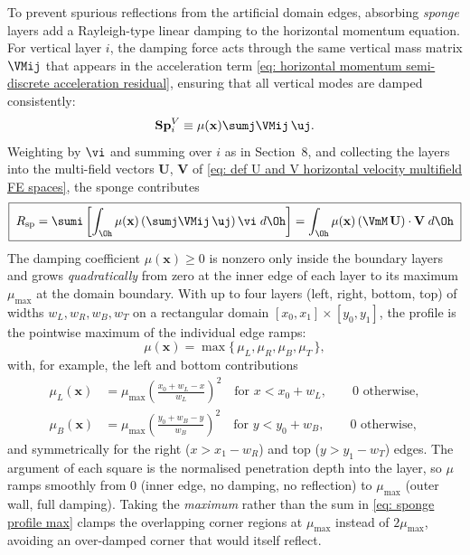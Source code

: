 To prevent spurious reflections from the artificial domain edges, absorbing \emph{sponge} layers add a
Rayleigh-type linear damping to the horizontal momentum equation. For vertical layer $i$, the damping
force acts through the same vertical mass matrix $\VMij$ that appears in the acceleration term
\eqref{eq: horizontal momentum semi-discrete acceleration residual}, ensuring that all vertical modes
are damped consistently:
\begin{equation}
    \mathbf{Sp}_i^V \equiv \mu(\mathbf{x})\sumj \VMij\,\uj .
    \label{eq: sponge semi-discrete term}
\end{equation}
Weighting by $\vi$ and summing over $i$ as in Section~8, and collecting the layers into the
multi-field vectors $\mathbf{U}$, $\mathbf{V}$ of
\eqref{eq: def U and V horizontal velocity multifield FE spaces}, the sponge contributes
\begin{equation}
    \boxed{\; R_{\text{sp}} = \sumi\left[\int_{\Oh}\mu(\mathbf{x})\left(\sumj\VMij\,\uj\right)\vi\;d\Oh\right] = \int_{\Oh}\mu(\mathbf{x})\left(\VmM\,\mathbf{U}\right)\cdot\mathbf{V}\;d\Oh \;}
    \label{eq: sponge residual contribution}
\end{equation}
The damping coefficient $\mu(\mathbf{x})\ge0$ is nonzero only inside the boundary layers and grows
\emph{quadratically} from zero at the inner edge of each layer to its maximum $\mu_{\max}$ at the
domain boundary. With up to four layers (left, right, bottom, top) of widths $w_L, w_R, w_B, w_T$ on a
rectangular domain $[x_0,x_1]\times[y_0,y_1]$, the profile is the pointwise maximum of the individual
edge ramps:
\begin{equation}
    \mu(\mathbf{x}) = \max\Big\{\, \mu_L, \mu_R, \mu_B, \mu_T \,\Big\},
    \label{eq: sponge profile max}
\end{equation}
with, for example, the left and bottom contributions
\begin{align}
    \mu_L(\mathbf{x}) &= \mu_{\max}\left(\frac{x_0 + w_L - x}{w_L}\right)^{2}
        \quad\text{for } x < x_0 + w_L, \qquad 0 \text{ otherwise}, \label{eq: sponge left}\\[1mm]
    \mu_B(\mathbf{x}) &= \mu_{\max}\left(\frac{y_0 + w_B - y}{w_B}\right)^{2}
        \quad\text{for } y < y_0 + w_B, \qquad 0 \text{ otherwise}, \label{eq: sponge bottom}
\end{align}
and symmetrically for the right ($x > x_1 - w_R$) and top ($y > y_1 - w_T$) edges. The argument of
each square is the normalised penetration depth into the layer, so $\mu$ ramps smoothly from $0$
(inner edge, no damping, no reflection) to $\mu_{\max}$ (outer wall, full damping). Taking the
\emph{maximum} rather than the sum in \eqref{eq: sponge profile max} clamps the overlapping corner
regions at $\mu_{\max}$ instead of $2\mu_{\max}$, avoiding an over-damped corner that would itself
reflect.

